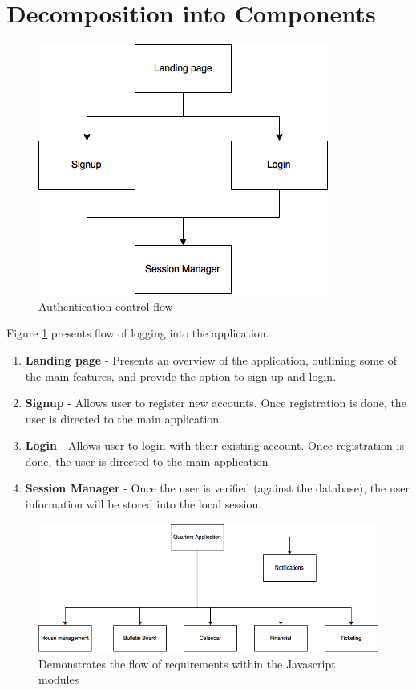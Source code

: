 \documentclass[12pt]{article}
\begin{document}
%
\section{Decomposition into Components}
\begin{figure}
\centering
\includegraphics[scale=0.75]{login}
\caption{Authentication control flow}
\label{fig:auflow}
\end{figure}

Figure \ref{fig:auflow} presents flow of logging into the application.
\begin{enumerate}
    \item \textbf{Landing page} - Presents an overview of the application, outlining some of the main features, and provide the option to sign up and login.
    \item \textbf{Signup} - Allows user to register new accounts. Once registration is done, the user is directed to the main application.
    \item \textbf{Login} - Allows user to login with their existing account. Once registration is done, the user is directed to the main application
    \item \textbf{Session Manager} - Once the user is verified (against the database), the user information will be stored into the local session.
\end{enumerate}


\begin{figure}
\centering
\includegraphics[width=\textwidth]{quarters}
\caption{Demonstrates the flow of requirements within the Javascript modules}
\label{fig:jsflow}
\end{figure}
\end{document}
